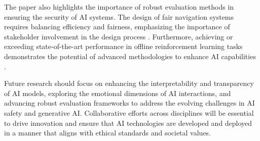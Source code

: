 The paper also highlights the importance of robust evaluation methods in ensuring the security of AI systems. The design of fair navigation systems requires balancing efficiency and fairness, emphasizing the importance of stakeholder involvement in the design process \cite{brandao2020fairnavigationplanninghumanitarian}. Furthermore, achieving or exceeding state-of-the-art performance in offline reinforcement learning tasks demonstrates the potential of advanced methodologies to enhance AI capabilities \cite{wang2023environmenttransformerpolicyoptimization}.



Future research should focus on enhancing the interpretability and transparency of AI models, exploring the emotional dimensions of AI interactions, and advancing robust evaluation frameworks to address the evolving challenges in AI safety and generative AI. Collaborative efforts across disciplines will be essential to drive innovation and ensure that AI technologies are developed and deployed in a manner that aligns with ethical standards and societal values.